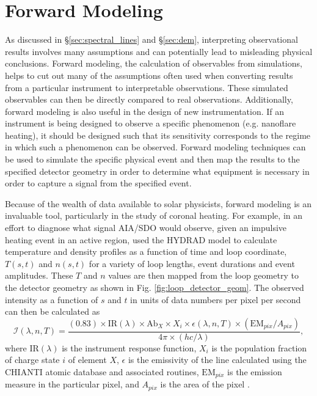 \section{Forward Modeling}
\label{sec:forward_modeling}
%
\par As discussed in \S\ref{sec:spectral_lines} and \S\ref{sec:dem}, interpreting observational results involves many assumptions and can potentially lead to misleading physical conclusions. Forward modeling, the calculation of observables from simulations, helps to cut out many of the assumptions often used when converting results from a particular instrument to interpretable observations. These simulated observables can then be directly compared to real observations. Additionally, forward modeling is also useful in the design of new instrumentation. If an instrument is being designed to observe a specific phenomenon (e.g. nanoflare heating), it should be designed such that its sensitivity corresponds to the regime in which such a phenomenon can be observed. Forward modeling techniques can be used to simulate the specific physical event and then map the results to the specified detector geometry in order to determine what equipment is necessary in order to capture a signal from the specified event.
%
\par Because of the wealth of data available to solar physicists, forward modeling is an invaluable tool, particularly in the study of coronal heating. For example, in an effort to diagnose what signal AIA/SDO would observe, given an impulsive heating event in an active region, \citet{bradshaw_what_2011} used the HYDRAD model \citep{bradshaw_influence_2013} to calculate temperature and density profiles as a function of time and loop coordinate, $T(s,t)$ and $n(s,t)$ for a variety of loop lengths, event durations and event amplitudes. These $T$ and $n$ values are then mapped from the loop geometry to the detector geometry as shown in Fig. \ref{fig:loop_detector_geom}. The observed intensity as a function of $s$ and $t$ in units of data numbers per pixel per second can then be calculated as
\begin{equation}
	\mathcal{I}(\lambda,n,T)=\frac{(0.83)\times\mathrm{IR}(\lambda)\times\mathrm{Ab}_X\times X_i\times\epsilon(\lambda,n,T)\times(\mathrm{EM}_{pix}/A_{pix})}{4\pi\times(hc/\lambda)},
	\label{eq:fm_intensity}
\end{equation}
where $\mathrm{IR}(\lambda)$ is the instrument response function, $X_i$ is the population fraction of charge state $i$ of element $X$, $\epsilon$ is the emissivity of the line calculated using the CHIANTI atomic database and associated routines, $\mathrm{EM}_{pix}$ is the emission measure in the particular pixel, and $A_{pix}$ is the area of the pixel \citep{bradshaw_what_2011}.
